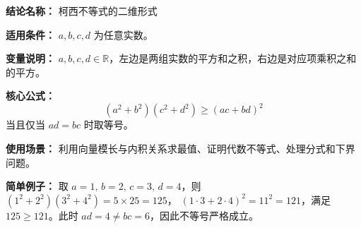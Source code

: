 \textbf{结论名称：} 柯西不等式的二维形式

\textbf{适用条件：} \(a,b,c,d\) 为任意实数。

\textbf{变量说明：} \(a,b,c,d\in\mathbb{R}\)，左边是两组实数的平方和之积，右边是对应项乘积之和的平方。

\textbf{核心公式：} \[ \boxed{(a^{2}+b^{2})(c^{2}+d^{2})\geq (ac+bd)^{2}} \] 当且仅当 \(ad=bc\) 时取等号。

\textbf{使用场景：} 利用向量模长与内积关系求最值、证明代数不等式、处理分式和下界问题。

\textbf{简单例子：} 取 \(a=1,\,b=2,\,c=3,\,d=4\)，则 \((1^{2}+2^{2})(3^{2}+4^{2})=5\times25=125\)， \((1\cdot3+2\cdot4)^{2}=11^{2}=121\)，满足 \(125\geq121\)。此时 \(ad=4\neq bc=6\)，因此不等号严格成立。